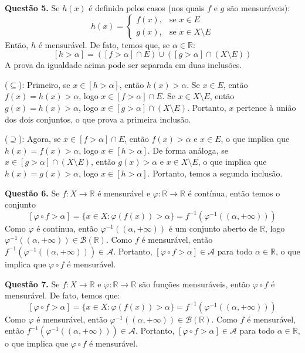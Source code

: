 \documentclass[12pt, a4paper]{article}
\newenvironment{solution}[1]{\par\vspace{1.2em}\noindent\textbf{Questão #1.}}{\par\vspace{0.5em}}
\newcommand{\R}{\mathbb{R}}
\newcommand{\A}{\mathcal{A}}
\newcommand{\B}{\mathcal{B}}
\begin{document}
\begin{solution}{5}
    Se $h(x)$ é definida pelos casos (nos quais $f$ e $g$ são mensuráveis):
    \[
        h(x) = 
        \begin{cases}
            f(x), & \text{se } x \in E \\
            g(x), & \text{se } x \in X \setminus E
        \end{cases}
    \]
    Então, $h$ é mensurável. De fato, temos que, se $\alpha \in \R$:
    \[
        [h > \alpha] = ([f > \alpha] \cap E) \cup ([g > \alpha] \cap (X \setminus E))
    \]
    A prova da igualdade acima pode ser separada em duas inclusões. 

    ($\subseteq$): Primeiro, se $x \in [h > \alpha]$, então $h(x) > \alpha$. Se $x \in E$, então $f(x) = h(x) > \alpha$, logo $x \in [f > \alpha] \cap E$. Se $x \in X \setminus E$, então $g(x) = h(x) > \alpha$, logo $x \in [g > \alpha] \cap (X \setminus E)$. Portanto, $x$ pertence à união dos dois conjuntos, o que prova a primeira inclusão.

    ($\supseteq$): Agora, se $x \in [f > \alpha] \cap E$, então $f(x) > \alpha$ e $x \in E$, o que implica que $h(x) = f(x) > \alpha$, logo $x \in [h > \alpha]$. De forma análoga, se $x \in [g > \alpha] \cap (X \setminus E)$, então $g(x) > \alpha$ e $x \in X \setminus E$, o que implica que $h(x) = g(x) > \alpha$, logo $x \in [h > \alpha]$. Portanto, temos a segunda inclusão.
\end{solution}

\begin{solution}{6}
    Se $f: X \to \R$ é mensurável e $\varphi: \R \to \R$ é contínua, então temos o conjunto 
\[
    [\varphi \circ f > \alpha] = \{x \in X : \varphi(f(x)) > \alpha\} = f^{-1}(\varphi^{-1}((\alpha, +\infty)))
\]
Como $\varphi$ é contínua, então $\varphi^{-1}((\alpha, +\infty))$ é um conjunto aberto de $\R$, logo $\varphi^{-1}((\alpha, +\infty)) \in \B(\R)$. Como $f$ é mensurável, então $f^{-1}(\varphi^{-1}((\alpha, +\infty))) \in \A$. Portanto, $[\varphi \circ f > \alpha] \in \A$ para todo $\alpha \in \R$, o que implica que $\varphi \circ f$ é mensurável.
\end{solution}

\begin{solution}{7}
    Se $f: X \to \R$ e $\varphi: \R \to \R$ são funções mensuráveis, então $\varphi \circ f$ é mensurável. De fato, temos que:
\[
    [\varphi \circ f > \alpha] = \{x \in X : \varphi(f(x)) > \alpha\} = f^{-1}(\varphi^{-1}((\alpha, +\infty))) 
\]
Como $\varphi$ é mensurável, então $\varphi^{-1}((\alpha, +\infty)) \in \B(\R)$. Como $f$ é mensurável, então $f^{-1}(\varphi^{-1}((\alpha, +\infty))) \in \A$. Portanto, $[\varphi \circ f > \alpha] \in \A$ para todo $\alpha \in \R$, o que implica que $\varphi \circ f$ é mensurável.
\end{solution}
\end{document}
